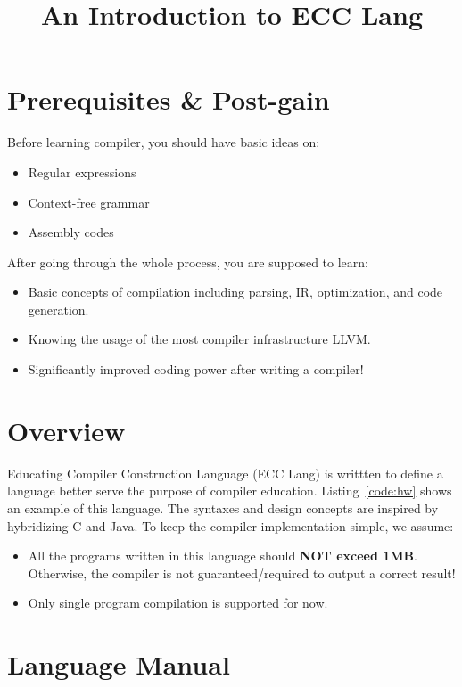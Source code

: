 \documentclass{article}
\title{An Introduction to ECC Lang}
\date{}
\begin{document}
\maketitle

\section{Prerequisites \& Post-gain}

Before learning compiler, you should have basic ideas on:
\begin{itemize}
  \item Regular expressions
  \item Context-free grammar
  \item Assembly codes
\end{itemize}

\noindent After going through the whole process, you are supposed to learn:
\begin{itemize}
  \item Basic concepts of compilation including parsing, IR, optimization, and code generation.
  \item Knowing the usage of the most compiler infrastructure LLVM.
  \item Significantly improved coding power after writing a compiler!
\end{itemize}

\section{Overview}

Educating Compiler Construction Language (ECC Lang) is writtten to define
a language better serve the purpose of compiler education.
Listing~\ref{code:hw} shows an example of this language.
The syntaxes and design concepts are inspired by hybridizing C and Java.
To keep the compiler implementation simple, we assume:
\begin{itemize}
  \item All the programs written in this language should \textbf{NOT exceed 1MB}.
    Otherwise, the compiler is not guaranteed/required to output a correct result!
  \item Only single program compilation is supported for now.
\end{itemize}

\section{Language Manual}
\end{document}
